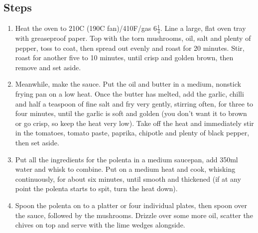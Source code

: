 \documentclass{book}
\begin{document}
\subsection*{Steps}
\begin{enumerate}
\item Heat the oven to 210C (190C fan)/410F/gas 6$\frac{1}{4}$. Line a large, flat oven tray with greaseproof paper. Top with the torn mushrooms, oil, salt and plenty of pepper, toss to coat, then spread out evenly and roast for 20 minutes. Stir, roast for another five to 10 minutes, until crisp and golden brown, then remove and set aside.
\item Meanwhile, make the sauce. Put the oil and butter in a medium, nonstick frying pan on a low heat. Once the butter has melted, add the garlic, chilli and half a teaspoon of fine salt and fry very gently, stirring often, for three to four minutes, until the garlic is soft and golden (you don’t want it to brown or go crisp, so keep the heat very low). Take off the heat and immediately stir in the tomatoes, tomato paste, paprika, chipotle and plenty of black pepper, then set aside.
\item Put all the ingredients for the polenta in a medium saucepan, add 350ml water and whisk to combine. Put on a medium heat and cook, whisking continuously, for about six minutes, until smooth and thickened (if at any point the polenta starts to spit, turn the heat down).
\item Spoon the polenta on to a platter or four individual plates, then spoon over the sauce, followed by the mushrooms. Drizzle over some more oil, scatter the chives on top and serve with the lime wedges alongside.
\end{enumerate}
\newpage
\end{document}
